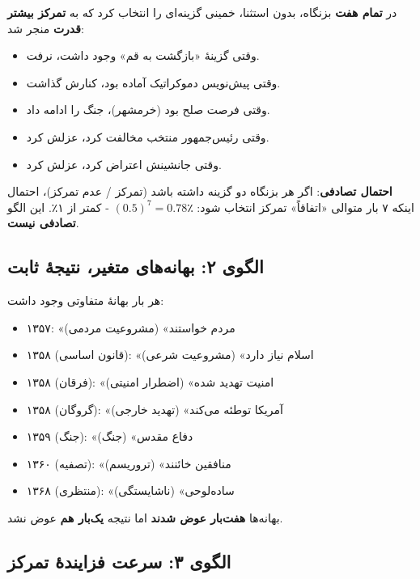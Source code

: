 \documentclass[12pt,a4paper]{book}
\newcommand{\keyword}[1]{\textbf{\textcolor{cPrimary}{#1}}}
\begin{document}
\begin{warningBox}
در \keyword{تمام هفت} بزنگاه، بدون استثنا، خمینی گزینه‌ای را انتخاب کرد که به \keyword{تمرکز بیشتر قدرت} منجر شد:

\begin{itemize}[label=\textcolor{cAccent}{$\blacktriangleright$}, rightmargin=2em]
    \item وقتی گزینهٔ «بازگشت به قم» وجود داشت، نرفت.
    \item وقتی پیش‌نویس دموکراتیک آماده بود، کنارش گذاشت.
    \item وقتی فرصت صلح بود (خرمشهر)، جنگ را ادامه داد.
    \item وقتی رئیس‌جمهور منتخب مخالفت کرد، عزلش کرد.
    \item وقتی جانشینش اعتراض کرد، عزلش کرد.
\end{itemize}

\textbf{احتمال تصادفی}: اگر هر بزنگاه دو گزینه داشته باشد (تمرکز / عدم تمرکز)، احتمال اینکه ۷ بار متوالی «اتفاقاً» تمرکز انتخاب شود: $(0.5)^7 = 0.78٪$ - کمتر از ۱٪. این الگو \keyword{تصادفی نیست}.
\end{warningBox}

\subsection{الگوی ۲: بهانه‌های متغیر، نتیجهٔ ثابت}

\begin{noteBox}
هر بار بهانهٔ متفاوتی وجود داشت:
\begin{itemize}[label=\textcolor{cGold}{$\bullet$}, rightmargin=2em]
    \item ۱۳۵۷: «مردم خواستند» (مشروعیت مردمی)
    \item ۱۳۵۸ (قانون اساسی): «اسلام نیاز دارد» (مشروعیت شرعی)
    \item ۱۳۵۸ (فرقان): «امنیت تهدید شده» (اضطرار امنیتی)
    \item ۱۳۵۸ (گروگان): «آمریکا توطئه می‌کند» (تهدید خارجی)
    \item ۱۳۵۹ (جنگ): «دفاع مقدس» (جنگ)
    \item ۱۳۶۰ (تصفیه): «منافقین خائنند» (تروریسم)
    \item ۱۳۶۸ (منتظری): «ساده‌لوحی» (ناشایستگی)
\end{itemize}

بهانه‌ها \keyword{هفت‌بار عوض شدند} اما نتیجه \keyword{یک‌بار هم} عوض نشد.
\end{noteBox}

\subsection{الگوی ۳: سرعت فزایندهٔ تمرکز}
\end{document}
